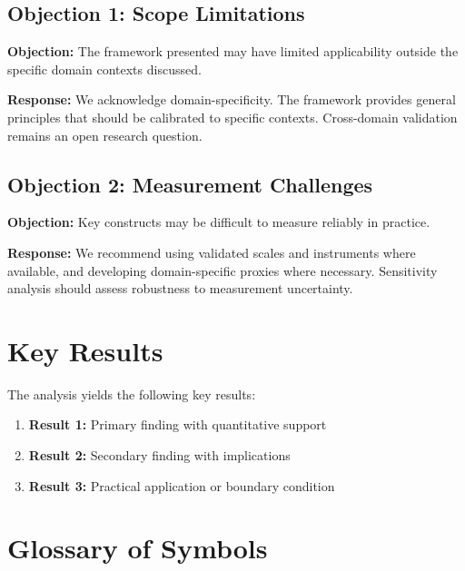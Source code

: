 \subsection{Objection 1: Scope Limitations}

\textbf{Objection:} The framework presented may have limited applicability
outside the specific domain contexts discussed.

\textbf{Response:} We acknowledge domain-specificity. The framework provides
general principles that should be calibrated to specific contexts. Cross-domain
validation remains an open research question.

\subsection{Objection 2: Measurement Challenges}

\textbf{Objection:} Key constructs may be difficult to measure reliably in
practice.

\textbf{Response:} We recommend using validated scales and instruments where
available, and developing domain-specific proxies where necessary. Sensitivity
analysis should assess robustness to measurement uncertainty.





\section{Key Results}
\label{sec:hai-results}

The analysis yields the following key results:

\begin{enumerate}
    \item \textbf{Result 1:} Primary finding with quantitative support
    \item \textbf{Result 2:} Secondary finding with implications
    \item \textbf{Result 3:} Practical application or boundary condition
\end{enumerate}

\section{Glossary of Symbols}
\label{sec:hai-glossary}

